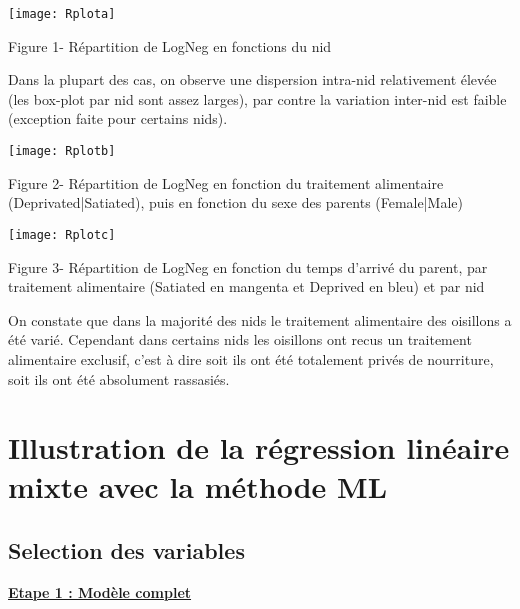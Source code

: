 \documentclass[12pt,fleqn]{book} %
\begin{document}
\texttt{[image: Rplota]}
\begin{center} Figure 1- Répartition de LogNeg en fonctions du nid\end{center}

\vspace{1em}

Dans la plupart des cas, on observe une dispersion intra-nid relativement élevée (les box-plot par nid sont assez larges), par contre la variation inter-nid est faible (exception faite pour certains nids).

\newpage

\texttt{[image: Rplotb]}
\begin{center} Figure 2- Répartition de LogNeg en fonction du traitement alimentaire (Deprivated\:|\:Satiated), puis en fonction du sexe des parents (Female\:|\:Male)\end{center}

\vspace{2em}

\texttt{[image: Rplotc]}
\begin{center} Figure 3- Répartition de LogNeg en fonction du temps d'arrivé du parent, par traitement alimentaire (Satiated en mangenta  et Deprived en bleu) et par nid \end{center}

\vspace{2em}

On constate que dans la majorité des nids le traitement alimentaire des oisillons a été varié. Cependant dans certains nids les oisillons ont recus un traitement alimentaire exclusif, c'est à dire soit ils ont été totalement privés de nourriture, soit ils ont été absolument rassasiés.

 
\newpage

\section{Illustration de la régression linéaire mixte avec la méthode ML }

\vspace{1em}

\subsection{Selection des variables} 

\vspace{1em}

\underline{\textbf{Etape 1 : Modèle complet}}
\end{document}
